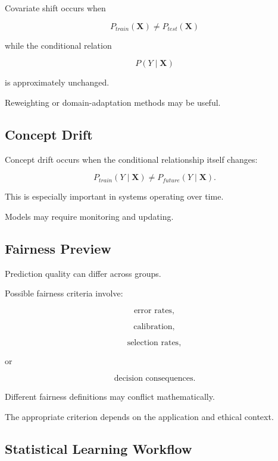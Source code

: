 Covariate shift occurs when

\[
\boxed{
P_{train}(\mathbf{X})
\neq
P_{test}(\mathbf{X})
}
\]

while the conditional relation

\[
P(Y\mid\mathbf{X})
\]

is approximately unchanged.

Reweighting or domain-adaptation methods may be useful.

\subsection{Concept Drift}
\label{subsec:concept-drift}

Concept drift occurs when the conditional relationship itself changes:

\[
\boxed{
P_{train}(Y\mid\mathbf{X})
\neq
P_{future}(Y\mid\mathbf{X}).
}
\]

This is especially important in systems operating over time.

Models may require monitoring and updating.

\subsection{Fairness Preview}
\label{subsec:fairness-preview}

Prediction quality can differ across groups.

Possible fairness criteria involve:

\[
\boxed{
\text{error rates},
}
\]

\[
\boxed{
\text{calibration},
}
\]

\[
\boxed{
\text{selection rates},
}
\]

or

\[
\boxed{
\text{decision consequences}.
}
\]

Different fairness definitions may conflict mathematically.

The appropriate criterion depends on the application and ethical
context.

\subsection{Statistical Learning Workflow}
\label{subsec:statistical-learning-workflow}

